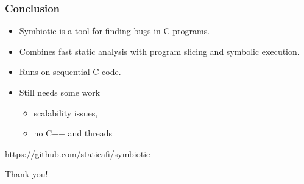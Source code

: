 \documentclass[sans]{beamer}
\begin{document}
\begin{frame}
\frametitle{Conclusion}
\begin{itemize}
  \item Symbiotic is a tool for finding bugs in C programs.
  \item Combines fast static analysis with program slicing and symbolic execution.
  \item Runs on sequential C code.
  \item Still needs some work
  \begin{itemize}
    \item scalability issues,
    \item no C++ and threads
  \end{itemize}
\end{itemize}

\pause
\bigskip
\begin{center}
\url{https://github.com/staticafi/symbiotic}
\end{center}
\bigskip
\hfill Thank you!


\end{frame}
\end{document}
